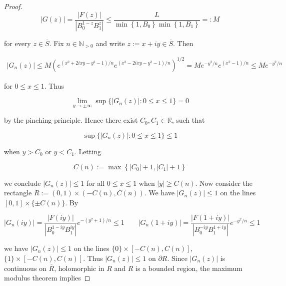 \begin{proof}
\begin{equation*}
	\left| G(z)\right| = \frac{\left| F(z)\right|}{\left| B_0^{1 - z}B_1^z \right|} \leqslant \frac{L}{\min\left\{1,B_0\right\}\min\left\{1,B_1\right\}} =: M
\end{equation*}

for every $z \in \overline{S}$. Fix $n \in \mathbb{N}_{>0}$ and write $z := x + iy \in \overline{S}$. Then

\begin{gather*}
	\left| G_n(z)\right| \leqslant M \left(e^{\left(x^2 + 2ixy -y^2 - 1\right)/n} e^{\left(x^2 - 2ixy -y^2 - 1\right)/n}\right)^{1/2}= M e^{-y^2/n}e^{\left(x^2 - 1\right)/n} \leqslant Me^{-y^2/n}
\end{gather*}

for $0 \leqslant x \leqslant 1$. Thus
	
\begin{equation*}
	\lim_{y \to \pm \infty}\sup\{\left| G_n(z)\right| : 0 \leqslant x \leqslant 1\} = 0
\end{equation*}

by the pinching-principle. Hence there exist $C_0,C_1 \in \mathbb{R}$, such that 

\begin{equation*}
	\sup\{\left| G_n(z)\right| : 0 \leqslant x \leqslant 1\} \leqslant 1
\end{equation*}

when $y > C_0$ or $y < C_1$. Letting

\begin{equation*}
	C(n) := \max\left\{ \left| C_0\right| + 1, \left| C_1 \right| + 1\right\}
\end{equation*}

we conclude $\left| G_n(z) \right| \leqslant 1$ for all $0 \leqslant x \leqslant 1$ when $\left| y \right| \geqslant C(n)$. Now consider the rectangle $R := \left(0,1\right) \times \left(-C(n),C(n)\right)$. We have $\left| G_n(z) \right| \leqslant 1$ on the lines $[0,1] \times \{\pm C(n)\}$. By

\begin{equation*}
	\left| G_n(iy)\right| = \frac{\left| F(iy)\right|}{\left| B_0^{1 - iy} B_1^{iy}\right|}e^{-\left( y^2 + 1 \right)/n} \leqslant 1 \qquad \left| G_n(1 + iy)\right| =	\frac{\left| F(1 + iy)\right|}{\left| B_0^{-iy}B_1^{1 + iy}\right|}e^{-y^2/n} \leqslant 1
\end{equation*}

we have $\left| G_n(z)\right| \leqslant 1$ on the lines $\{0\} \times [-C(n),C(n)]$, $\{1\} \times [-C(n),C(n)]$. Thus $\left| G_n(z) \right| \leqslant 1$ on $\partial R$. Since $\left| G_n(z)\right|$ is continuous on $\overline{R}$, holomorphic in $R$ and $R$ is a bounded region, the maximum modulus theorem implies


\end{proof}
